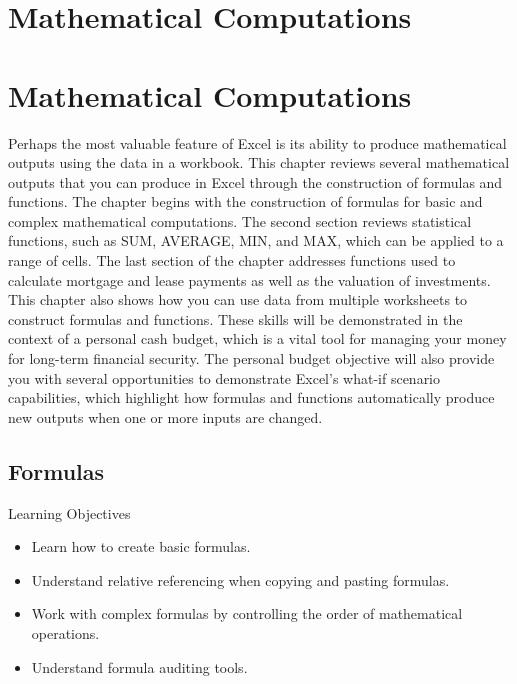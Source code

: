 \chapter{Mathematical Computations}\label{ch02:mathematical_computations}

\chapter{Mathematical Computations}

Perhaps the most valuable feature of Excel is its ability to produce mathematical outputs using the data in a workbook. This chapter reviews several mathematical outputs that you can produce in Excel through the construction of formulas and functions. The chapter begins with the construction of formulas for basic and complex mathematical computations. The second section reviews statistical functions, such as SUM, AVERAGE, MIN, and MAX, which can be applied to a range of cells. The last section of the chapter addresses functions used to calculate mortgage and lease payments as well as the valuation of investments. This chapter also shows how you can use data from multiple worksheets to construct formulas and functions. These skills will be demonstrated in the context of a personal cash budget, which is a vital tool for managing your money for long-term financial security. The personal budget objective will also provide you with several opportunities to demonstrate Excel's what-if scenario capabilities, which highlight how formulas and functions automatically produce new outputs when one or more inputs are changed.

\section{Formulas}

\begin{center}
	\begin{objbox}{Learning Objectives}
		\begin{itemize}
			\setlength{\itemsep}{0pt}
			\setlength{\parskip}{0pt}
			\setlength{\parsep}{0pt}
			
			\item Learn how to create basic formulas.
			\item Understand relative referencing when copying and pasting formulas.
			\item Work with complex formulas by controlling the order of mathematical operations.
			\item Understand formula auditing tools.

		\end{itemize}
	\end{objbox}
\end{center}

